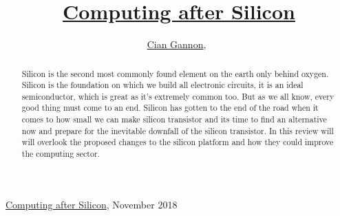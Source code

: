 \documentclass[journal]{IEEEtran}
\begin{document}
%
{\href{https://github.com/cian2009/ResearchMethods}{Computing after Silicon}, November 2018}

\title{\href{https://github.com/cian2009/ResearchMethods}{Computing after Silicon}}
\author{\href{https://github.com/cian2009}{Cian Gannon},~}
\maketitle

\begin{abstract}
Silicon is the second most commonly found element on the earth only behind oxygen. Silicon is the foundation on which we build all electronic circuits, it is an ideal semiconductor, which is great as it's extremely common too. But as we all know, every good thing must come to an end. Silicon has gotten to the end of the road when it comes to how small we can make silicon transistor and its time to find an alternative now and prepare for the inevitable downfall of the silicon transistor. In this review will will overlook the proposed changes to the silicon platform and how they could improve the computing sector.
\end{abstract}
\end{document}
